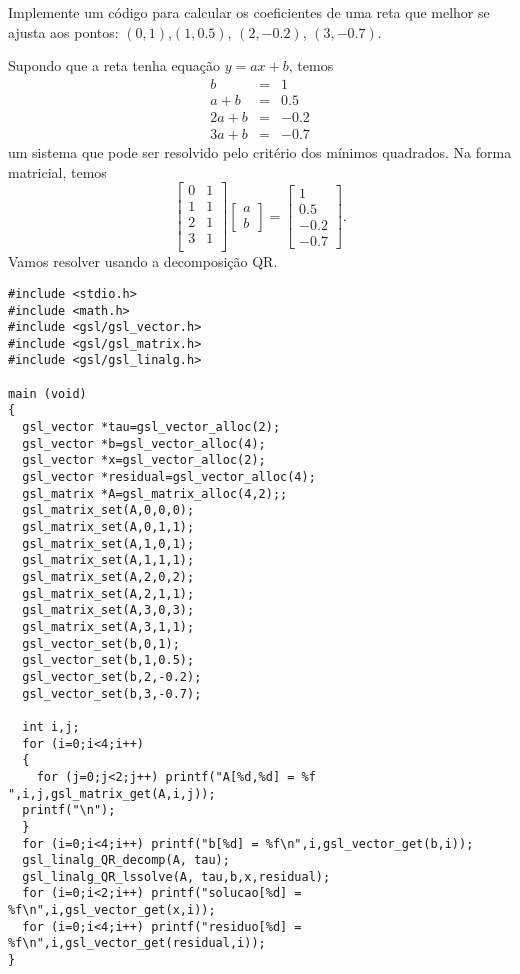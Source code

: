 \begin{ex}
Implemente um código para calcular os coeficientes de uma reta que melhor se ajusta aos pontos: $(0,1)$,$(1,0.5)$, $(2,-0.2)$, $(3,-0.7)$.   
\end{ex}
Supondo que a reta tenha equação $y=ax+b$, temos
\begin{eqnarray}
 b&=&1\\
 a+b&=&0.5\\
 2a+b&=&-0.2\\
 3a+b&=&-0.7
\end{eqnarray}
um sistema que pode ser resolvido pelo critério dos mínimos quadrados. Na forma matricial, temos
$$
\left[\begin{array}{cc}
0&1\\
1&1\\
2&1\\
3&1\\
\end{array}\right]\left[\begin{array}{c}a\\b\end{array}\right]=
\left[\begin{array}{c}1\\0.5\\-0.2\\ -0.7\end{array}\right].
$$
Vamos resolver usando a decomposição QR.
\begin{verbatim}
#include <stdio.h>
#include <math.h>
#include <gsl/gsl_vector.h>
#include <gsl/gsl_matrix.h>
#include <gsl/gsl_linalg.h>

main (void)
{
  gsl_vector *tau=gsl_vector_alloc(2);
  gsl_vector *b=gsl_vector_alloc(4);
  gsl_vector *x=gsl_vector_alloc(2);
  gsl_vector *residual=gsl_vector_alloc(4);
  gsl_matrix *A=gsl_matrix_alloc(4,2);;
  gsl_matrix_set(A,0,0,0);
  gsl_matrix_set(A,0,1,1);
  gsl_matrix_set(A,1,0,1);
  gsl_matrix_set(A,1,1,1);
  gsl_matrix_set(A,2,0,2);
  gsl_matrix_set(A,2,1,1);
  gsl_matrix_set(A,3,0,3);
  gsl_matrix_set(A,3,1,1);
  gsl_vector_set(b,0,1);
  gsl_vector_set(b,1,0.5);
  gsl_vector_set(b,2,-0.2);
  gsl_vector_set(b,3,-0.7);

  int i,j;
  for (i=0;i<4;i++)
  {
    for (j=0;j<2;j++) printf("A[%d,%d] = %f ",i,j,gsl_matrix_get(A,i,j));
  printf("\n");
  }
  for (i=0;i<4;i++) printf("b[%d] = %f\n",i,gsl_vector_get(b,i));
  gsl_linalg_QR_decomp(A, tau);
  gsl_linalg_QR_lssolve(A, tau,b,x,residual);
  for (i=0;i<2;i++) printf("solucao[%d] = %f\n",i,gsl_vector_get(x,i));
  for (i=0;i<4;i++) printf("residuo[%d] = %f\n",i,gsl_vector_get(residual,i));
}
\end{verbatim}

